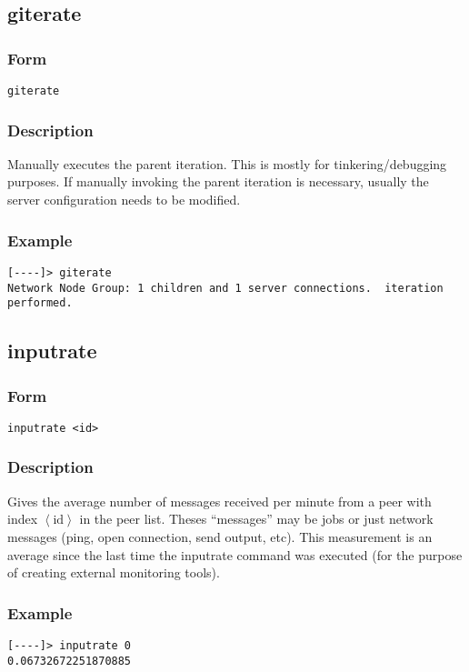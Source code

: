 \documentclass[12pt]{article}
\begin{document}
\subsection{giterate}
\subsubsection{Form}
\begin{verbatim}
giterate
\end{verbatim}
\subsubsection{Description}
Manually executes the parent iteration. This is mostly for tinkering/debugging purposes. If manually invoking the parent iteration is necessary, usually the server configuration needs to be modified.
\subsubsection{Example}
\begin{verbatim}
[----]> giterate
Network Node Group: 1 children and 1 server connections.  iteration performed.
\end{verbatim}


\subsection{inputrate}
\subsubsection{Form}
\begin{verbatim}
inputrate <id>
\end{verbatim}
\subsubsection{Description}
Gives the average number of messages received per minute from a peer with index $\left<\text{id}\right>$ in the peer list. Theses ``messages'' may be jobs or just network messages (ping, open connection, send output, etc). This measurement is an average since the last time the inputrate command was executed (for the purpose of creating external monitoring tools).
\subsubsection{Example}
\begin{verbatim}
[----]> inputrate 0
0.06732672251870885
\end{verbatim}
\end{document}
